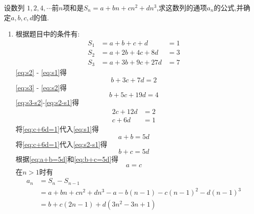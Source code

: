 \begin{questions}
	\question[8] 设数列 $1,2,4, \cdots$前$n$项和是$S_n = a + bn + cn^2 +
		dn^3$,求这数列的通项$a_n$的公式,并确定$a,b,c,d$的值.
	\begin{solution}
		\begin{enumerate}[label=\protect\circled{\arabic*}]
			\item 根据题目中的条件有:
			      \begin{align}
				      S_1 & = a + b + c + d     & = 1\label{eq:s1} \\
				      S_2 & = a + 2b + 4c + 8d  & = 3\label{eq:s2} \\
				      S_3 & = a + 3b + 9c + 27d & = 7\label{eq:s3}
			      \end{align}
			      \eqref{eq:s2} - \eqref{eq:s1}得
			      \begin{equation}
				      b + 3c + 7d =2 \label{eq:s2-s1}
			      \end{equation}
			      \eqref{eq:s3} - \eqref{eq:s2}得
			      \begin{equation}
				      b + 5c + 19d = 4
				      \label{eq:s3-s2}
			      \end{equation}
			      \eqref{eq:s3-s2}-\eqref{eq:s2-s1}得
			      \begin{align}
				      2c + 12d & = 2 \nonumber \\
				      c + 6d   & = 1
				      \label{eq:c+6d=1}
			      \end{align}
			      将\eqref{eq:c+6d=1}代入\eqref{eq:s1}得
			      \begin{equation}
				      a+b = 5d
				      \label{eq:a+b=5d}
			      \end{equation}
			      将\eqref{eq:c+6d=1}代入\eqref{eq:s2-s1}得
			      \begin{equation}
				      b+c = 5d
				      \label{eq:b+c=5d}
			      \end{equation}
			      根据\eqref{eq:a+b=5d}和\eqref{eq:b+c=5d}得
			      \begin{equation}
				      a = c
				      \label{eq:a=c}
			      \end{equation}
			      在$n>1$时有
			      \begin{align}
				      a_n & = S_n - S_{n-1} \nonumber                                           \\
				          & = a + bn + cn^2 + dn^3 - a - b(n-1) - c(n-1)^2 - d(n-1)^3 \nonumber \\
				          & = b + c(2n-1) + d(3n^2 - 3n + 1)
				      \label{eq:an}
			      \end{align}

\end{enumerate}
\end{solution}
\end{questions}
